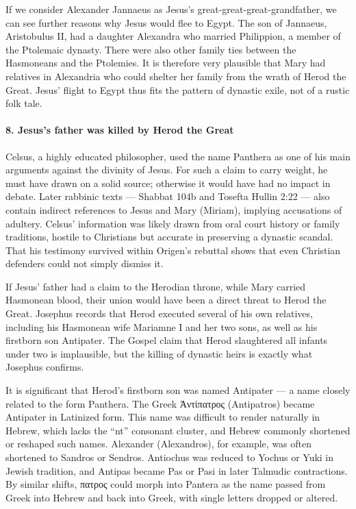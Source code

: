 If we consider Alexander Jannaeus as Jesus’s great-great-great-grandfather, we can see further reasons why Jesus would flee to Egypt.
The son of Jannaeus, Aristobulus II, had a daughter Alexandra who married Philippion, a member of the Ptolemaic dynasty.
There were also other family ties between the Hasmoneans and the Ptolemies.
It is therefore very plausible that Mary had relatives in Alexandria who could shelter her family from the wrath of Herod the Great.
Jesus’ flight to Egypt thus fits the pattern of dynastic exile, not of a rustic folk tale.

\paragraph{8.
Jesus's father was killed by Herod the Great}\label{par:jesuss-father-was-killed-by-herod-the-great}

Celsus, a highly educated philosopher, used the name Panthera as one of his main arguments against the divinity of Jesus.
For such a claim to carry weight, he must have drawn on a solid source; otherwise it would have had no impact in debate.
Later rabbinic texts — Shabbat 104b and Tosefta Hullin 2:22 — also contain indirect references to Jesus and Mary (Miriam), implying accusations of adultery.
Celsus’ information was likely drawn from oral court history or family traditions, hostile to Christians but accurate in preserving a dynastic scandal.
That his testimony survived within Origen’s rebuttal shows that even Christian defenders could not simply dismiss it.

If Jesus’ father had a claim to the Herodian throne, while Mary carried Hasmonean blood, their union would have been a direct threat to Herod the Great.
Josephus records that Herod executed several of his own relatives, including his Hasmonean wife Mariamne I and her two sons, as well as his firstborn son Antipater.
The Gospel claim that Herod slaughtered all infants under two is implausible, but the killing of dynastic heirs is exactly what Josephus confirms.

It is significant that Herod’s firstborn son was named Antipater — a name closely related to the form Panthera.
The Greek Ἀντίπατρος (Antipatros) became Antipater in Latinized form.
This name was difficult to render naturally in Hebrew, which lacks the “nt” consonant cluster, and Hebrew commonly shortened or reshaped such names.
Alexander (Alexandros), for example, was often shortened to Sandros or Sendros.
Antiochus was reduced to Yochus or Yuki in Jewish tradition, and Antipas became Pas or Pasi in later Talmudic contractions.
By similar shifts, πατρος could morph into Pantera as the name passed from Greek into Hebrew and back into Greek, with single letters dropped or altered.

